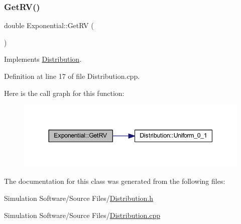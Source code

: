 \subsubsection{\texorpdfstring{Get\+R\+V()}{GetRV()}}
{\footnotesize\ttfamily double Exponential\+::\+Get\+RV (\begin{DoxyParamCaption}{ }\end{DoxyParamCaption})\hspace{0.3cm}{\ttfamily [virtual]}}



Implements \hyperlink{class_distribution_a63b433850d7b47d84eb69448f7916719}{Distribution}.



Definition at line 17 of file Distribution.\+cpp.

Here is the call graph for this function\+:\nopagebreak
\begin{figure}[H]
\begin{center}
\leavevmode
\includegraphics[width=344pt]{class_exponential_a2a45aeaf0a3725174d86712761a8dd82_cgraph}
\end{center}
\end{figure}


The documentation for this class was generated from the following files\+:\begin{DoxyCompactItemize}
\item 
Simulation Software/\+Source Files/\hyperlink{_distribution_8h}{Distribution.\+h}\item 
Simulation Software/\+Source Files/\hyperlink{_distribution_8cpp}{Distribution.\+cpp}\end{DoxyCompactItemize}
